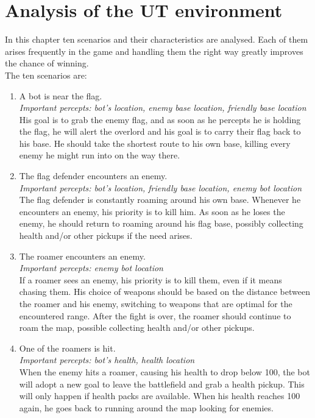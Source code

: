 \chapter{Analysis of the UT environment}
In this chapter ten scenarios and their characteristics are analysed. Each of them arises frequently in the game and handling them the right way greatly improves the chance of winning.\\
The ten scenarios are:
\begin{enumerate}
	\item A bot is near the flag. \\
	\textit{Important percepts: bot's location, enemy base location, friendly base location} \\
	His goal is to grab the enemy flag, and as soon as he percepts he is holding the flag, he will alert the overlord and his goal is to carry their flag back to his base. He should take the shortest route to his own base, killing every enemy he might run into on the way there.\\
	\item The flag defender encounters an enemy. \\
	\textit{Important percepts: bot's location, friendly base location, enemy bot location} \\
	The flag defender is constantly roaming around his own base. Whenever he encounters an enemy, his priority is to kill him. As soon as he loses the enemy, he should return to roaming around his flag base, possibly collecting health and/or other pickups if the need arises.\\
	\item The roamer encounters an enemy. \\
	\textit{Important percepts: enemy bot location} \\
	If a roamer sees an enemy, his priority is to kill them, even if it means chasing them. His choice of weapons should be based on the distance between the roamer and his enemy, switching to weapons that are optimal for the encountered range. After the fight is over, the roamer should continue to roam the map, possible collecting health and/or other pickups. \\
	\item One of the roamers is hit. \\
	\textit{Important percepts: bot's health, health location} \\
	When the enemy hits a roamer, causing his health to drop below 100, the bot will adopt a new goal to leave the battlefield and grab a health pickup. This will only happen if health packs are available. When his health reaches 100 again, he goes back to running around the map looking for enemies.\\

\end{enumerate}
